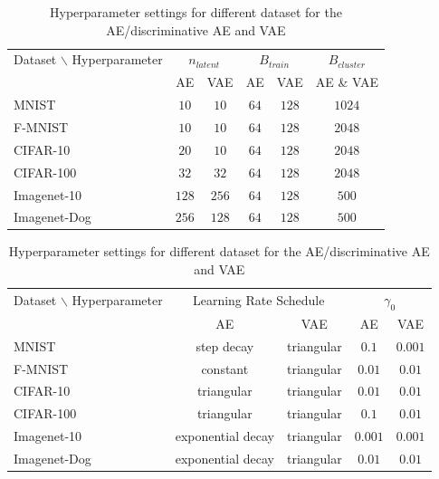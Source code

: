\documentclass[12pt,DIV14,BCOR12mm,a4paper,footexclude,headinclude,halfparskip-,twoside,openright,cleardoubleempty,idxtotoc,bibtotoc,listtotoc,abstracton]{scrreprt} %
\numberwithin{equation}{chapter}
\begin{document}
	\begin{table}[htb!]
    		\caption{Hyperparameter settings for different dataset for the AE/discriminative AE and VAE}
    		\label{tab:Hyperparametersettings_AE_b_AE}
    		\begin{tabular}{l|ccccc}
    			\toprule
        		Dataset $\backslash$ Hyperparameter & \multicolumn{2}{c}{$n_{latent}$} & \multicolumn{2}{c}{$B_{train}$} & $B_{cluster}$\\
        		& AE & VAE & AE & VAE & AE \& VAE\\
        		\midrule
        		MNIST & $10$ & $10$ & $64$ & $128$ & $1024$\\
        		F-MNIST & $10$ & $10$ & $64$ & $128$ & $2048$\\
        		CIFAR-10 & $20$ & $10$ & $64$ & $128$ & $2048$\\
        		CIFAR-100 & $32$ & $32$ & $64$ & $128$ & $2048$\\
        		Imagenet-10 & $128$ & $256$ & $64$ & $128$ & $500$\\
        		Imagenet-Dog & $256$ & $128$ & $64$ & $128$ & $500$\\
        		\bottomrule
    		\end{tabular}
    		\begin{tabular}{l|cccc}
    			\toprule
        		Dataset $\backslash$ Hyperparameter & \multicolumn{2}{c}{Learning Rate Schedule} & \multicolumn{2}{c}{$\gamma_0$}\\
        		& AE & VAE & AE & VAE\\
        		\midrule
        		MNIST & step decay & triangular & $0.1$ & $0.001$\\
        		F-MNIST & constant & triangular & $0.01$ & $0.01$\\
        		CIFAR-10 & triangular & triangular & $0.01$ & $0.01$\\
        		CIFAR-100 & triangular & triangular & $0.1$ & $0.01$\\
        		Imagenet-10 & exponential decay & triangular & $0.001$ & $0.001$\\
        		Imagenet-Dog & exponential decay & triangular & $0.01$ & $0.01$\\
        		\bottomrule
    		\end{tabular}
	\end{table}
\end{document}
